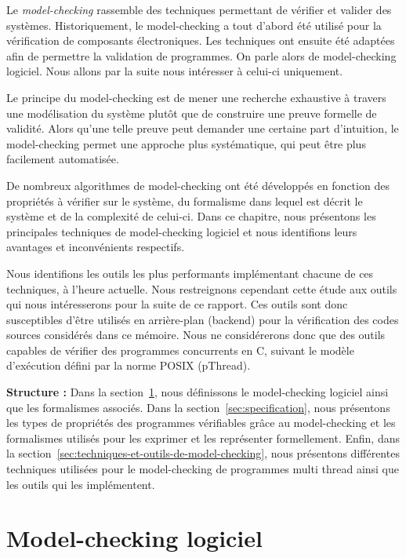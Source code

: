 \label{sec:RevLitt}

Le \emph{model-checking} rassemble des techniques permettant de vérifier
et valider des systèmes. Historiquement, le model-checking a
tout d'abord été utilisé pour la vérification de composants
électroniques. Les techniques ont ensuite été adaptées afin de permettre
la validation de programmes. On parle alors de model-checking logiciel.
Nous allons par la suite nous intéresser à celui-ci uniquement.

Le principe du model-checking est de mener une recherche
exhaustive à travers une modélisation du système plutôt que de
construire une preuve formelle de validité. Alors qu'une telle preuve
peut demander une certaine part d'intuition, le model-checking permet
une approche plus systématique, qui peut être plus facilement
automatisée.

De nombreux algorithmes de model-checking ont été développés en fonction
des propriétés à vérifier sur le système, du formalisme dans lequel est
décrit le système et de la complexité de celui-ci.
Dans ce chapitre, nous présentons les principales techniques de
model-checking logiciel et nous identifions leurs avantages et
inconvénients respectifs.

Nous identifions les outils les plus performants implémentant chacune de ces
techniques, à l'heure actuelle. Nous restreignons cependant cette étude aux
outils qui nous intéresserons pour la suite de ce rapport. Ces outils sont donc
susceptibles d'être utilisés en arrière-plan (backend) pour la vérification des
codes sources considérés dans ce mémoire. Nous ne considérerons donc que
des outils capables de vérifier des programmes concurrents en C, suivant le
modèle d'exécution défini par la norme POSIX (pThread).

\textbf{Structure :} Dans la section~\ref{sec:model-checking-logiciel}, nous
définissons le model-checking logiciel ainsi que les formalismes associés.
Dans la section~\ref{sec:specification}, nous présentons
les types de propriétés des programmes vérifiables grâce au model-checking et
les formalismes utilisés pour les exprimer et les représenter formellement.
Enfin, dans la section~\ref{sec:techniques-et-outils-de-model-checking}, nous
présentons différentes techniques utilisées pour le model-checking de programmes
multi thread ainsi que les outils qui les implémentent.

\section{Model-checking logiciel}\label{sec:model-checking-logiciel}

